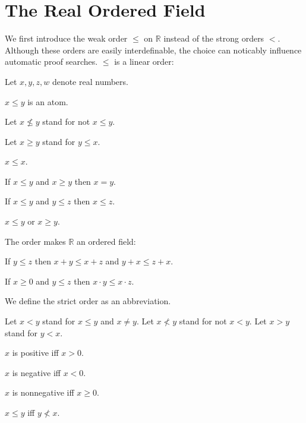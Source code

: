 \documentclass{article}
\begin{document}
\section{The Real Ordered Field}

We first introduce the weak order $\leq$ on $\mathbb{R}$
instead of
the strong orders $<$. Although these orders are easily
interdefinable, the choice can noticably influence automatic
proof searches. $\leq$ is a linear order:

\begin{forthel}
Let $x,y,z,w$ denote real numbers.

\begin{signature}
$x \leq y$ is an atom.
\end{signature}


Let $x \nleq y$ stand for not $x \leq y$.

Let $x \geq y$ stand for $y \leq x$.

\begin{axiom}
$x \leq x$.
\end{axiom}

\begin{axiom}
If $x \leq y$ and $x \geq y$ then $x=y$.
\end{axiom}

\begin{axiom}
If $x \leq y$ and $y \leq z$ then $x \leq z$.
\end{axiom}

\begin{axiom}
$x \leq y$ or $x \geq y$.
\end{axiom}

\end{forthel}
The order makes $\mathbb{R}$ an ordered field:
\begin{forthel}
\begin{axiom}
If $y \leq z$ then $x + y \leq x + z$ and $y + x \leq z + x$.
\end{axiom}

\begin{axiom}[title=1 17 ii]
If $x \geq 0$ and $y \leq z$ then $x \cdot y \leq x \cdot z$.
\end{axiom}
\end{forthel}
We define the strict order as an abbreviation.
\begin{forthel}
Let $x < y$ stand for $x \leq y$ and $x \neq y$.
Let $x \nless y$ stand for not $x < y$.
Let $x > y$ stand for $y < x$.

\begin{definition}
$x$ is positive iff $x > 0$.
\end{definition}

\begin{definition}
$x$ is negative iff $x < 0$.
\end{definition}

\begin{definition}
$x$ is nonnegative iff $x \geq 0$.
\end{definition}

\begin{lemma}
$x \leq y$ iff $y \nless x$.
\end{lemma}
\end{forthel}
\end{document}
